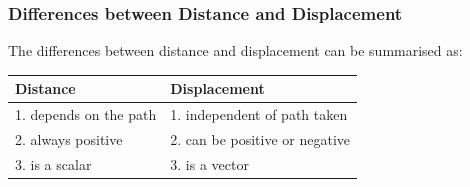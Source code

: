             \subsubsection*{Differences between Distance and Displacement}
            \nopagebreak
        \label{m38788*id63938}The differences between distance and displacement can be summarised as:\par 
\begin{center}
\begin{tabular}{|l|l|}\hline
\textbf{ Distance } & \textbf{ Displacement } \\\hline
1. depends on the path & 1. independent of path taken \\\hline
2. always positive & 2. can be positive or negative \\\hline
3. is a scalar & 3. is a vector\\\hline
\end{tabular}
\end{center}
    \par
\label{m38788*secfhsst!!!underscore!!!id498}
